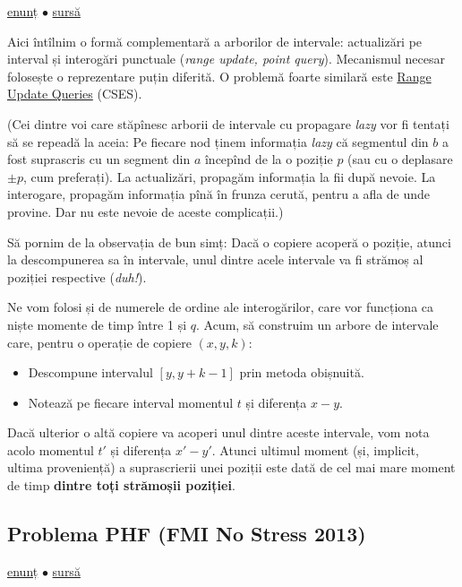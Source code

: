 \href{https://codeforces.com/contest/292/problem/E}{enunț}
$\bullet$
\hyperref[code:copying-data]{sursă}

Aici întîlnim o formă complementară a arborilor de intervale: actualizări pe interval și interogări punctuale (\textit{range update, point query}). Mecanismul necesar folosește o reprezentare puțin diferită. O problemă foarte similară este \href{https://cses.fi/problemset/task/1651}{Range Update Queries} (CSES).

(Cei dintre voi care stăpînesc arborii de intervale cu propagare \textit{lazy} vor fi tentați să se repeadă la aceia: Pe fiecare nod ținem informația \textit{lazy} că segmentul din $b$ a fost suprascris cu un segment din $a$ începînd de la o poziție $p$ (sau cu o deplasare $\pm p$, cum preferați). La actualizări, propagăm informația la fii după nevoie. La interogare, propagăm informația pînă în frunza cerută, pentru a afla de unde provine. Dar nu este nevoie de aceste complicații.)

Să pornim de la observația de bun simț: Dacă o copiere acoperă o poziție, atunci la descompunerea sa în intervale, unul dintre acele intervale va fi strămoș al poziției respective (\textit{duh!}).

Ne vom folosi și de numerele de ordine ale interogărilor, care vor funcționa ca niște momente de timp între 1 și $q$. Acum, să construim un arbore de intervale care, pentru o operație de copiere $(x, y, k)$:

\begin{itemize}
  \item Descompune intervalul $[y, y + k - 1]$ prin metoda obișnuită.
  \item Notează pe fiecare interval momentul $t$ și diferența $x-y$.
\end{itemize}

Dacă ulterior o altă copiere va acoperi unul dintre aceste intervale, vom nota acolo momentul $t'$ și diferența $x'-y'$. Atunci ultimul moment (și, implicit, ultima proveniență) a suprascrierii unei poziții este dată de cel mai mare moment de timp \textbf{dintre toți strămoșii poziției}.

\subsection{Problema PHF (FMI No Stress 2013)}
\label{problem:phf}

\href{https://kilonova.ro/problems/3234}{enunț}
$\bullet$
\hyperref[code:phf]{sursă}


